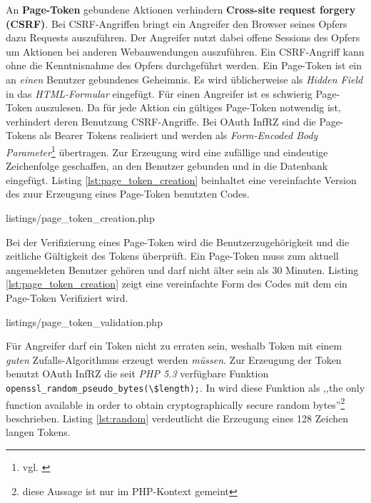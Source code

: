 \documentclass[12pt,a4paper,pointednumbers,abstracton]{scrartcl}
\newcommand{\code}[1]{\small\lstinline[style=InlinePHP]!#1!\normalsize}
\begin{document}
An \textbf{Page-Token} gebundene Aktionen verhindern \textbf{Cross-site request forgery (CSRF)}.
Bei CSRF-Angriffen bringt ein Angreifer den Browser seines Opfers dazu Requests auszuführen.
Der Angreifer nutzt dabei offene Sessions des Opfers um Aktionen bei anderen Webanwendungen auszuführen.
Ein CSRF-Angriff kann ohne die Kenntnisnahme des Opfers durchgeführt werden.
Ein Page-Token ist ein an \emph{einen} Benutzer gebundenes Geheimnis.
Es wird üblicherweise als \emph{Hidden Field} in das \emph{HTML-Formular} eingefügt.
Für einen Angreifer ist es schwierig Page-Token auszulesen.
Da für jede Aktion ein gültiges Page-Token notwendig ist, verhindert deren Benutzung CSRF-Angriffe.
Bei OAuth InfRZ sind die Page-Tokens als Bearer Tokens realisiert und werden als \emph{Form-Encoded Body Parameter}\footnote{vgl. \cite[Section 2.2]{RFC6750}} übertragen.
Zur Erzeugung wird eine zufällige und eindeutige Zeichenfolge geschaffen, an den Benutzer gebunden und in die Datenbank eingefügt.
Listing \ref{lst:page_token_creation} beinhaltet eine vereinfachte Version des zuur Erzeugung eines Page-Token benutzten Codes.

\begin{minipage}{\textwidth}
	
	{listings/page_token_creation.php}
\end{minipage} 

Bei der Verifizierung eines Page-Token wird die Benutzerzugehörigkeit und die zeitliche Gültigkeit des Tokens überprüft.
Ein Page-Token muss zum aktuell angemeldeten Benutzer gehören und darf nicht älter sein als 30 Minuten.
Listing \ref{lst:page_token_creation} zeigt eine vereinfachte Form des Codes mit dem ein Page-Token Verifiziert wird.

\begin{minipage}{\textwidth}
	
	{listings/page_token_validation.php}
\end{minipage}

Für Angreifer darf ein Token nicht zu erraten sein, weshalb Token mit einem \emph{guten} Zufalls-Algorithmus erzeugt werden \emph{müssen}.
Zur Erzeugung der Token benutzt OAuth InfRZ die seit \emph{PHP 5.3} verfügbare Funktion \code{openssl_random_pseudo_bytes(\$length);}.
In \cite[Section 2.2]{AK12} wird diese Funktion als ,,the only function available in order to obtain cryptographically secure random bytes''\footnote{diese Aussage ist nur im PHP-Kontext gemeint} beschrieben.
Listing \ref{lst:random} verdeutlicht die Erzeugung eines 128 Zeichen langen Tokens.
\end{document}
